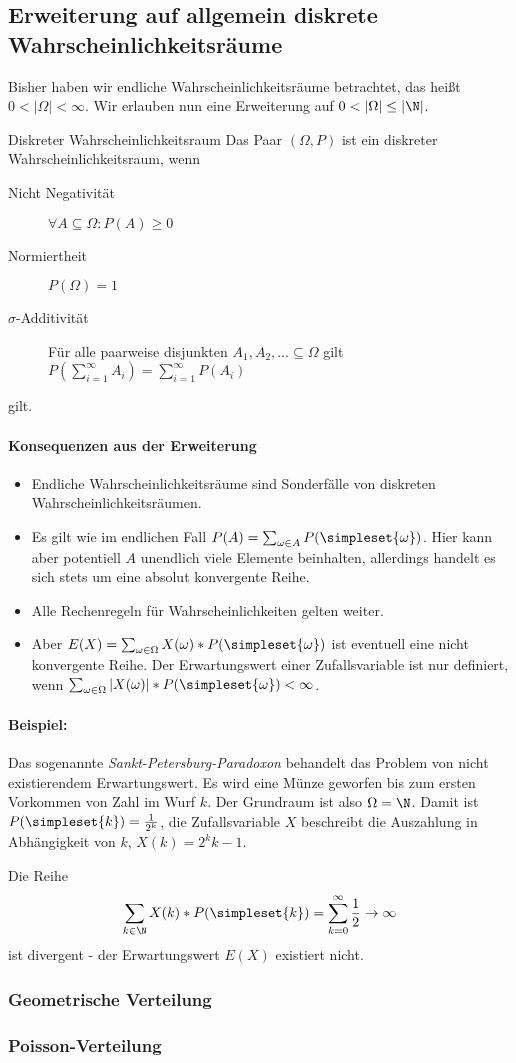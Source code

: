 \subsection{Erweiterung auf allgemein diskrete Wahrscheinlichkeitsräume}
Bisher haben wir endliche Wahrscheinlichkeitsräume betrachtet, das heißt $0<|\Omega|<\infty$. Wir erlauben nun eine Erweiterung auf $0<|\Omega|\leq|\N|$.

\begin{definition}{Diskreter Wahrscheinlichkeitsraum}
	Das Paar $(\Omega, P)$ ist ein diskreter Wahrscheinlichkeitsraum, wenn
	\begin{description}
		\item[Nicht Negativität] $\forall A\subseteq \Omega: P(A)\geq 0$
		\item[Normiertheit] $P(\Omega)=1$
		\item[$\sigma$-Additivität] Für alle paarweise disjunkten $A_1,A_2,\ldots\subseteq \Omega $ gilt $P(\sum_{i=1}^\infty A_i)=\sum_{i=1}^\infty P(A_i)$ 
	\end{description}
	gilt.
\end{definition}

\paragraph{Konsequenzen aus der Erweiterung}
\begin{itemize}
	\item Endliche Wahrscheinlichkeitsräume sind Sonderfälle von diskreten Wahrscheinlichkeitsräumen.
	\item Es gilt wie im endlichen Fall $P(A)=\sum_{\omega\in A}P(\simpleset{\omega})$. Hier kann aber potentiell $A$ unendlich viele Elemente beinhalten, allerdings handelt es sich stets um eine absolut konvergente Reihe.
	\item Alle Rechenregeln für Wahrscheinlichkeiten gelten weiter.
	\item Aber $E(X)=\sum_{\omega\in\Omega}X(\omega)*P(\simpleset{\omega})$ ist eventuell eine nicht konvergente Reihe. Der Erwartungswert einer Zufallsvariable ist nur definiert, wenn $\sum_{\omega\in\Omega}|X(\omega)|*P(\simpleset{\omega})<\infty$.
\end{itemize}
\paragraph{Beispiel:}
Das sogenannte \emph{Sankt-Petersburg-Paradoxon} behandelt das Problem von nicht existierendem Erwartungswert.
Es wird eine Münze geworfen bis zum ersten Vorkommen von Zahl im Wurf $k$. Der Grundraum ist also $\Omega=\N$. Damit ist $P(\simpleset{k})=\frac{1}{2^k}$, die Zufallsvariable $X$ beschreibt die Auszahlung in Abhängigkeit von $k$, $X(k)=2^k{k-1}$.

Die Reihe
\begin{equation*}
	\sum_{k\in\N}X(k)*P(\simpleset{k})=\sum_{k=0}^\infty \frac12 \rightarrow \infty
\end{equation*}
ist divergent - der Erwartungswert $E(X)$ existiert nicht.

\subsubsection{Geometrische Verteilung}



\subsubsection{Poisson-Verteilung}